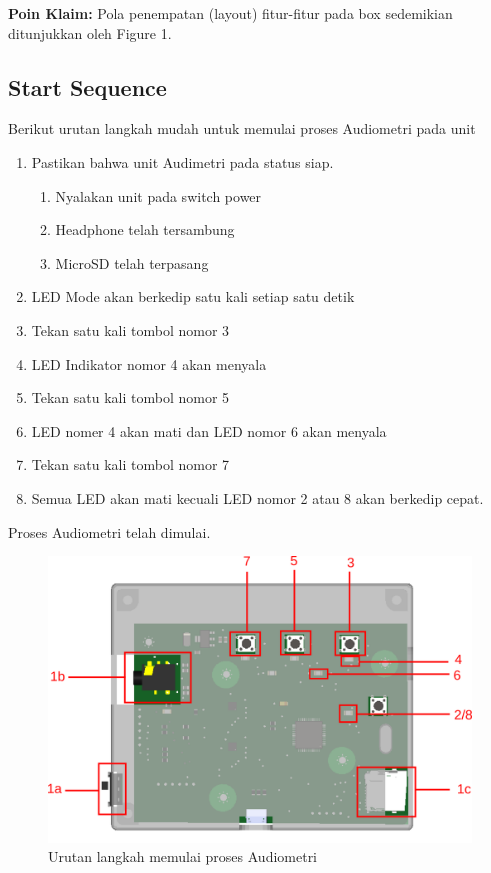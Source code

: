 \documentclass[12pt,]{article}
\begin{document}
	\textbf{Poin Klaim:} Pola penempatan (layout) fitur-fitur pada box sedemikian ditunjukkan oleh Figure 1.
	
	\newpage
	\subsection{Start Sequence}
	
	Berikut urutan langkah mudah untuk memulai proses Audiometri pada unit
	\begin{enumerate}
		\item Pastikan bahwa unit Audimetri pada status siap.
		\begin{enumerate}
			\renewcommand{\theenumi}{\Alph{enumi}}
			
			\item Nyalakan unit pada switch power
			\item Headphone telah tersambung
			\item MicroSD telah terpasang
		\end{enumerate}
	
		\item LED Mode akan berkedip satu kali setiap satu detik
		\item Tekan satu kali tombol nomor 3 
		\item LED Indikator nomor 4 akan menyala
		\item Tekan satu kali tombol nomor 5
		\item LED nomer 4 akan mati dan LED nomor 6 akan menyala
		\item Tekan satu kali tombol nomor 7
		\item Semua LED akan mati kecuali LED nomor 2 atau 8 akan berkedip cepat.
	\end{enumerate}

	Proses Audiometri telah dimulai.

	\begin{figure}[!ht]
		\centering
		\includegraphics[width=400pt]{images/fig_2_startup}
		\caption{Urutan langkah memulai proses Audiometri}
	\end{figure}
\end{document}
